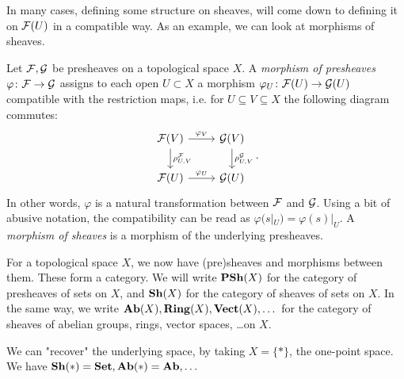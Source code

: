 \documentclass{article}
\begin{document}
In many cases, defining some structure on sheaves, will come down
to defining it on $\mathcal{F}(U)$ in a compatible way.
As an example, we can look at morphisms of sheaves.
\begin{definition}
    Let $\mathcal{F}, \mathcal{G}$ be presheaves on a topological space $X$.
    A  \emph{morphism of presheaves} $\varphi \colon \mathcal{F} \to \mathcal{G}$ assigns to
    each open $U\subset X$ a morphism $\varphi_U \colon \mathcal{F}(U) \to \mathcal{G}(U)$
    compatible with the restriction maps, i.e. for $U\subseteq V \subseteq X$
    the following diagram commutes:
    \begin{equation*}
        \begin{tikzcd}
            \mcF(V) \rar["\varphi_V"] \dar["\rho^\mcF_{U,V}"]
            & \mcG(V) \dar["\rho^\mcG_{U,V}"] \\
            \mcF(U) \rar["\varphi_U"]
            & \mcG(U)
        \end{tikzcd}.
    \end{equation*}
    In other words, $\varphi$ is a natural transformation between $\mathcal{F}$ and $\mathcal{G}$.
    Using a bit of abusive notation, the compatibility can be read as
    $\varphi(s|_U) = \varphi(s)|_U$.
    A \emph{morphism of sheaves} is a morphism of the underlying presheaves.
\end{definition}

For a topological space $X$, we now have (pre)sheaves and morphisms between them.
These form a category. We will write $\operatorname{\mathbf{PSh}}(X)$ for the category of presheaves of
sets on $X$, and $\operatorname{\mathbf{Sh}}(X)$ for the category of sheaves of sets on $X$.
In the same way, we write $\operatorname{\mathbf{Ab}}(X), \operatorname{\mathbf{Ring}}(X), \operatorname{\mathbf{Vect}}(X),\dots $ for the category of
sheaves of abelian groups, rings, vector spaces, \dots on $X$.
\begin{remark}
    We can "recover" the underlying space, by taking $X = \{*\}$,
    the one-point space. We have $\operatorname{\mathbf{Sh}}(*) = \operatorname{\mathbf{Set}}, \operatorname{\mathbf{Ab}}(*) = \operatorname{\mathbf{Ab}}, \dots$
\end{remark}
\end{document}
